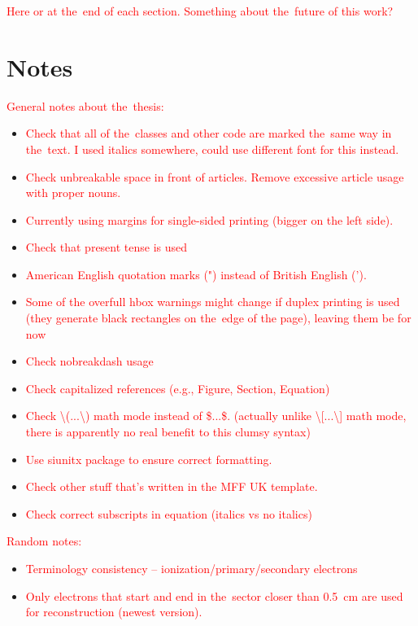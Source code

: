 	\textcolor{red}{Here or at the~end of each section. Something about the~future of this work?}
	
	\section*{Notes}
		\textcolor{red}{General notes about the~thesis:}
		\begin{itemize}
			\item \textcolor{red}{Check that all of the~classes and other code are marked the~same way in the~text. I used italics somewhere, could use different font for this instead.}
			\item \textcolor{red}{Check unbreakable space in front of articles. Remove excessive article usage with proper nouns.}
			\item \textcolor{red}{Currently using margins for single-sided printing (bigger on the left side).}
			\item \textcolor{red}{Check that present tense is used}
			\item \textcolor{red}{American English quotation marks (") instead of British English (').}
			\item \textcolor{red}{Some of the overfull hbox warnings might change if duplex printing is used (they generate black rectangles on the~edge of the page), leaving them be for now}
			\item \textcolor{red}{Check nobreakdash usage}
			\item \textcolor{red}{Check capitalized references (e.g., Figure, Section, Equation)}
			\item \textcolor{red}{Check \textbackslash(...\textbackslash) math mode instead of \$...\$. (actually unlike \textbackslash[...\textbackslash] math mode, there is apparently no real benefit to this clumsy syntax)}
			\item \textcolor{red}{Use siunitx package to ensure correct formatting.}
			\item \textcolor{red}{Check other stuff that's written in the MFF UK template.}
			\item \textcolor{red}{Check correct subscripts in equation (italics vs no italics)}
		\end{itemize}
		\textcolor{red}{Random notes:}
		\begin{itemize}
			\item \textcolor{red}{Terminology consistency -- ionization/primary/secondary electrons}
			\item \textcolor{red}{Only electrons that start and end in the~sector closer than 0.5~cm are used for reconstruction (newest version).}
		\end{itemize}
		
